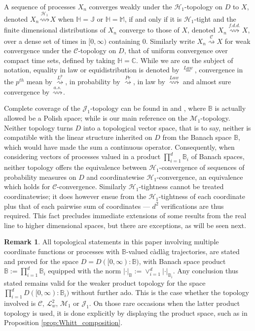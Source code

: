 \documentclass[final]{amsart}
\theoremstyle{definition}
\newtheorem{rem}{Remark}[section]
\numberwithin{equation}{section}
\newcommand{\dB}{\ensuremath{\mathbb{B}}}
\newcommand{\dC}{\ensuremath{\mathbb{C}}}
\newcommand{\dH}{\ensuremath{\mathbb{H}}}
\newcommand{\dJ}{\ensuremath{\mathbb{J}}}
\newcommand{\dM}{\ensuremath{\mathbb{M}}}
\newcommand{\cJ}{\ensuremath{\mathcal{J}}}
\newcommand{\cL}{\ensuremath{\mathcal{L}}}
\begin{document}
A sequence of processes $X_n$ converges weakly under the $\mathcal{H}_1$-topology on $D$ to $X$,
denoted $X_n\stackrel{\mathcal{H}_1}{\rightsquigarrow} X$ when $\dH=\dJ$ or $\dH=\dM$, if and only if
it is $\mathcal{H}_1$-tight and the finite dimensional distributions of $X_n$ converge to those of
$X$, denoted $X_n \stackrel{f.d.d.}{\rightsquigarrow} X$, over a dense set of times in $[0,\infty)$ containing $0$.
Similarly write $X_n\stackrel{\mathcal{C}}{\rightsquigarrow} X$ for weak convergence under the
$\mathcal{C}$-topology on $D$, that of uniform convergence over compact time sets, defined by taking $\dH=\dC$.
While we are on the subject of notation, equality in law or equidistribution is denoted by $\stackrel{Law}{=}$,
convergence in the $p^{th}$ mean by $\stackrel{L^p}{\rightsquigarrow}$,
in probability by $\stackrel{Pr}{\rightsquigarrow}$, in law by $\stackrel{Law}{\rightsquigarrow}$ and
almost sure convergence by $\stackrel{a.s.}{\rightsquigarrow}$.

Complete coverage of the $\cJ_1$-topology can be found in \citet{Ethier/Kurtz:1986} and \citet{Jacod/Shiryaev:2003},
where $\dB$ is actually allowed be a Polish space; while \citet{Whitt:2002} is our main reference on the $\mathcal{M}_1$-topology.
Neither topology turns $D$ into a topological vector space, that is to say, neither is compatible with the linear structure inherited
on $D$ from the Banach space $\dB$, which would have made the sum a continuous operator. Consequently, when considering vectors of processes valued in a product $\prod_{i=1}^d \dB_i$ of Banach spaces, neither topology offers the equivalence
between $\mathcal{H}_1$-convergence of sequences of probability measures on $D$ and coordinatewise $\mathcal{H}_1$-convergence,
an equivalence which holds for $\mathcal{C}$-convergence.
Similarly $\mathcal{H}_1$-tightness cannot be treated coordinatewise; it does however ensue from the
$\mathcal{H}_1$-tightness of each coordinate plus that of each pairwise sum of coordinates --- $d^2$ verifications are thus required.
This fact precludes immediate extensions of some results from the real line to higher dimensional spaces, but there are exceptions,
as will be seen next.

\begin{rem}\label{rem:producttopology}
All topological statements in this paper involving multiple coordinate functions or processes with $\dB$-valued c\`adl\`ag trajectories,
are stated and proved for the space $D=D([0,\infty):\dB)$, with Banach space product $\dB:=\prod_{i=1}^d\dB_i$ equipped with the norm
$| \cdot |_{\dB}:=\vee_{i=1}^d | \cdot |_{\dB_i}$. Any conclusion thus stated remains valid for the weaker
product topology for the space $\prod_{i=1}^d D([0,\infty):\dB_i)$ without further ado. This is the case whether the topology involved is
$\mathcal{C}$, $\cL^2_w$, $\mathcal{M}_1$ or $\mathcal{J}_1$. On those rare occasions when the latter product topology
is used, it is done explicitly by displaying the product space, such as in Proposition \ref{prop:Whitt_composition}.
\end{rem}
\end{document}
